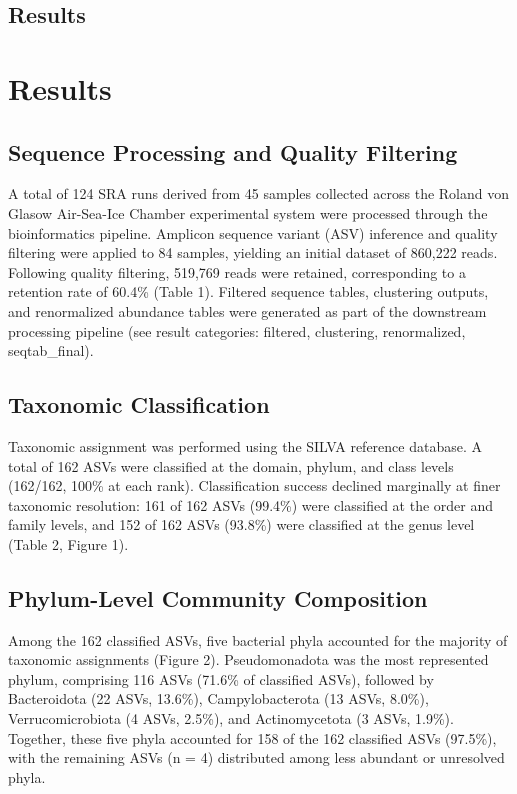 \documentclass[
  11pt,
]{article}
\begin{document}
\subsection{Results}\label{results}

\section{Results}\label{results-1}

\subsection{Sequence Processing and Quality
Filtering}\label{sequence-processing-and-quality-filtering}

A total of 124 SRA runs derived from 45 samples collected across the
Roland von Glasow Air-Sea-Ice Chamber experimental system were processed
through the bioinformatics pipeline. Amplicon sequence variant (ASV)
inference and quality filtering were applied to 84 samples, yielding an
initial dataset of 860,222 reads. Following quality filtering, 519,769
reads were retained, corresponding to a retention rate of 60.4\% (Table
1). Filtered sequence tables, clustering outputs, and renormalized
abundance tables were generated as part of the downstream processing
pipeline (see result categories: filtered, clustering, renormalized,
seqtab\_final).

\subsection{Taxonomic Classification}\label{taxonomic-classification}

Taxonomic assignment was performed using the SILVA reference database. A
total of 162 ASVs were classified at the domain, phylum, and class
levels (162/162, 100\% at each rank). Classification success declined
marginally at finer taxonomic resolution: 161 of 162 ASVs (99.4\%) were
classified at the order and family levels, and 152 of 162 ASVs (93.8\%)
were classified at the genus level (Table 2, Figure 1).

\subsection{Phylum-Level Community
Composition}\label{phylum-level-community-composition}

Among the 162 classified ASVs, five bacterial phyla accounted for the
majority of taxonomic assignments (Figure 2). Pseudomonadota was the
most represented phylum, comprising 116 ASVs (71.6\% of classified
ASVs), followed by Bacteroidota (22 ASVs, 13.6\%), Campylobacterota (13
ASVs, 8.0\%), Verrucomicrobiota (4 ASVs, 2.5\%), and Actinomycetota (3
ASVs, 1.9\%). Together, these five phyla accounted for 158 of the 162
classified ASVs (97.5\%), with the remaining ASVs (n = 4) distributed
among less abundant or unresolved phyla.
\end{document}
